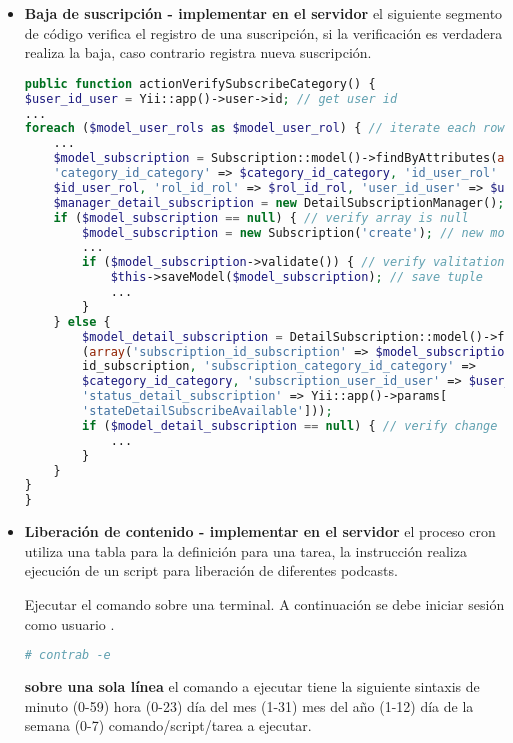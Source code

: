 \begin{itemize}
\item \textbf{Baja de suscripción - implementar en el servidor} el siguiente
segmento de código verifica el registro de una suscripción, si la verificación
es verdadera realiza la baja, caso contrario registra nueva suscripción.
\begin{lstlisting}[language=PHP, caption={Verificación registro suscripción.}]
public function actionVerifySubscribeCategory() {
$user_id_user = Yii::app()->user->id; // get user id
...
foreach ($model_user_rols as $model_user_rol) { // iterate each row UserRol
    ...
    $model_subscription = Subscription::model()->findByAttributes(array(
    'category_id_category' => $category_id_category, 'id_user_rol' => 
    $id_user_rol, 'rol_id_rol' => $rol_id_rol, 'user_id_user' => $user_id_user));
    $manager_detail_subscription = new DetailSubscriptionManager();
    if ($model_subscription == null) { // verify array is null
        $model_subscription = new Subscription('create'); // new model Interest
        ...
        if ($model_subscription->validate()) { // verify valitation
            $this->saveModel($model_subscription); // save tuple
            ...
        }
    } else {
        $model_detail_subscription = DetailSubscription::model()->findByAttributes
        (array('subscription_id_subscription' => $model_subscription->
        id_subscription, 'subscription_category_id_category' => 
        $category_id_category, 'subscription_user_id_user' => $user_id_user,
        'status_detail_subscription' => Yii::app()->params[
        'stateDetailSubscribeAvailable']));
        if ($model_detail_subscription == null) { // verify change
            ...
        }
    }
}    
}
\end{lstlisting}

\item \textbf{Liberación de contenido - implementar en el servidor} el
proceso cron utiliza una tabla para la definición para una tarea, la
instrucción realiza ejecución de un script para liberación de diferentes
podcasts.

Ejecutar el comando sobre una terminal. A continuación se debe iniciar sesión
como usuario .

\begin{lstlisting}[language=bash, caption={Acceso archivo crontab.}]
# contrab -e
\end{lstlisting}

\textbf{sobre una sola línea} el comando a ejecutar tiene la siguiente sintaxis
de minuto (0-59) hora (0-23) día del mes (1-31) mes del año (1-12) día de la
semana (0-7) comando/script/tarea a ejecutar.


\end{itemize}
